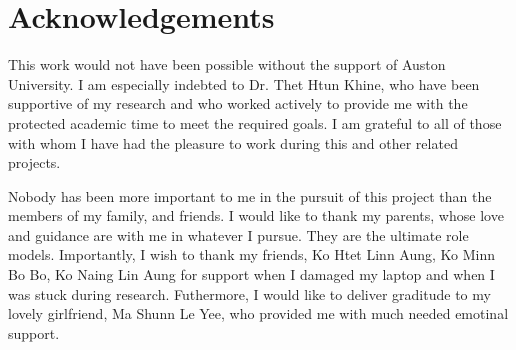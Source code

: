 {
\newpage
\vspace*{\fill}
{
	\centering
	\section*{Acknowledgements}
}
\indent This work would not have been possible without the support of Auston University.
I am especially indebted to Dr. Thet Htun Khine, who have been supportive of my research and who worked actively to provide me with the
protected academic time to meet the required goals.
I am grateful to all of those with whom I have had the pleasure to work during this and other related
projects.

\vspace{0.5cm}
Nobody has been more important to me in the pursuit of this project than the members of my family, and friends. I
would like to thank my parents, whose love and guidance are with me in whatever I pursue. They are the
ultimate role models. Importantly, I wish to thank my friends, Ko Htet Linn Aung, Ko Minn Bo Bo, Ko Naing Lin Aung for support when I damaged
my laptop and when I was stuck during research. 
Futhermore, I would like to deliver graditude to my lovely girlfriend, Ma Shunn Le Yee, who provided me with much needed emotinal
support.
\vspace*{\fill}
}
